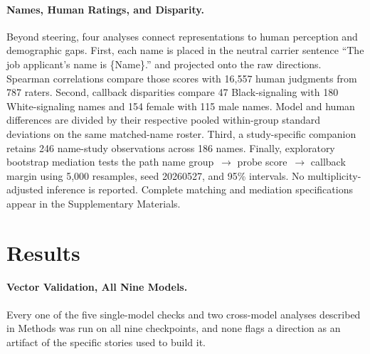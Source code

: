 \documentclass[twocolumn]{article}
\begin{document}
\paragraph{Names, Human Ratings, and Disparity.}
Beyond steering, four analyses connect representations to human perception
and demographic gaps. First, each name is placed in the neutral carrier
sentence ``The job applicant's name is \{Name\}.'' and projected onto the
raw directions. Spearman correlations compare those scores with 16{,}557
human judgments from 787 raters. Second, callback disparities compare 47
Black-signaling with 180 White-signaling names and 154 female with 115 male
names. Model and human differences are divided by their respective pooled
within-group standard deviations on the same matched-name roster. Third, a
study-specific companion retains 246 name-study observations across 186
names. Finally, exploratory bootstrap mediation tests the path name
group~$\to$ probe score~$\to$ callback margin using 5{,}000 resamples, seed
20260527, and 95\% intervals. No multiplicity-adjusted inference is reported.
Complete matching and mediation specifications appear in the Supplementary
Materials.

\section*{Results}

\paragraph{Vector Validation, All Nine Models.}
Every one of the five single-model checks and two cross-model analyses
described in Methods was run on all nine checkpoints, and none flags a
direction as an artifact of the specific stories used to build it.
\end{document}
